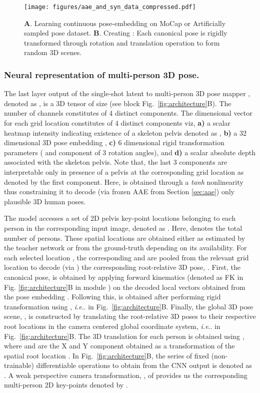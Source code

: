 \documentclass[runningheads]{llncs}
\makeatletter
\DeclareRobustCommand\onedot{\futurelet\@let@token\@onedot}
\def\@onedot{\ifx\@let@token.\else.\null\fi\xspace}
\def\ie{\emph{i.e}\onedot} \def\Ie{\emph{I.e}\onedot}
\makeatother
\begin{document}
\begin{figure}[t]
    \centering
    \texttt{[image: figures/aae\_and\_syn\_data\_compressed.pdf]}
   
    \caption{\textbf{A}. Learning continuous pose-embedding on MoCap or Artificially sampled pose dataset. 
    \textbf{B}. Creating : Each canonical pose   is rigidly transformed through rotation and translation operation to form random 3D scenes. 
    }
    \label{fig:aae_and_syn_scene}
\end{figure}

\subsubsection{Neural representation of multi-person 3D pose.}
The last layer output of the single-shot latent to multi-person 3D pose mapper , denoted as , is a 3D tensor of size  (see block  Fig.~\ref{fig:architecture}{\color{red}B}). The number of channels constitutes of 4 distinct components. The  dimensional vector for each grid location  constitutes of 4 distinct components viz, \textbf{a)} a scalar heatmap intensity indicating existence of a skeleton pelvis denoted as , \textbf{b)} a 32 dimensional 3D pose embedding , \textbf{c)} 6 dimensional rigid transformation parameters  ( and  component of 3 rotation angles), and \textbf{d)} a scalar absolute depth  associated with the skeleton pelvis. Note that, the last 3 components are interpretable only in presence of a pelvis at the corresponding grid location as denoted by the first component. Here,  is obtained through a \textit{tanh} nonlinearity thus constraining it to decode (via frozen  AAE from Section \ref{sec:aae})  only plausible 3D human poses.

The model accesses a set of 2D pelvis key-point locations belonging to each person in the corresponding input image, denoted as . Here,  denotes the total number of persons. These spatial locations are obtained either as estimated by the teacher network or from the ground-truth depending on its availability. For each selected location , the corresponding  and  are pooled from the relevant grid location to decode (via ) the corresponding root-relative 3D pose, . First, the canonical pose,  is obtained by applying forward kinematics (denoted as FK in Fig. \ref{fig:architecture}{\color{red}B} in module ) on the decoded local vectors obtained from the pose embedding . Following this,  is obtained after performing rigid transformation using , \ie  in Fig.~\ref{fig:architecture}{\color{red}B}. Finally, the global 3D pose scene, , is constructed by translating the root-relative 3D poses to their respective root locations in the camera centered global coordinate system, \ie  in Fig.~\ref{fig:architecture}{\color{red}B}. The 3D translation for each person  is obtained using , {where  and  are the X and Y component obtained as a transformation of the spatial root location }. In Fig.~\ref{fig:architecture}{\color{red}B}, the series of fixed (non-trainable) differentiable operations to obtain  from the CNN output  is denoted as . A {weak perspective camera transformation}, , of  provides us the corresponding multi-person 2D key-points denoted by . 
\end{document}
